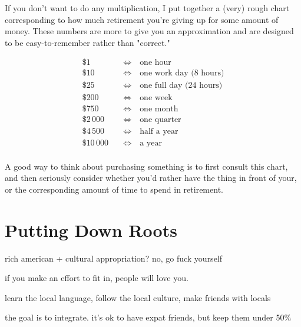 \documentclass[]{book}
\newcommand{\undefine}[1]{\let#1\undefined}
\begin{document}
If you don't want to do any multiplication, I put together a (very) rough chart
corresponding to how much retirement you're giving up for some amount of money.
These numbers are more to give you an approximation and are designed to be
easy-to-remember rather than "correct."

\newcommand{\xx}[2]{\$#1 &\quad\iff\quad \text{#2}\\}
\begin{align*}
  \xx{1}{one hour}
  \xx{10}{one work day (8 hours)}
  \xx{25}{one full day (24 hours)}
  \xx{200}{one week}
  \xx{750}{one month}
  \xx{2\,000}{one quarter}
  \xx{4\,500}{half a year}
  \xx{10\,000}{a year}
\end{align*}
\undefine\xx

A good way to think about purchasing something is to first consult this chart,
and then seriously consider whether you'd rather have the thing in front of
your, or the corresponding amount of time to spend in retirement.



\chapter{Putting Down Roots}

rich american + cultural appropriation? no, go fuck yourself

if you make an effort to fit in, people will love you.

learn the local language, follow the local culture, make friends with locals

the goal is to integrate. it's ok to have expat friends, but keep them under 50\%
\end{document}
